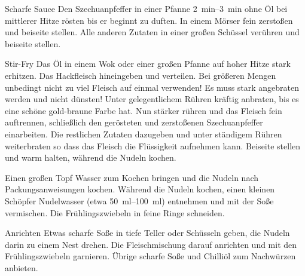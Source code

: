 \vspace{0.5cm}

\begin{recipestep}{Scharfe Sauce}
  Den Szechuanpfeffer in einer Pfanne \SIrange{2}{3}{\minute} ohne Öl bei mittlerer Hitze rösten bis er beginnt zu duften.
  In einem Mörser fein zerstoßen und beiseite stellen. Alle anderen Zutaten in einer großen Schüssel verühren und beiseite stellen.
\end{recipestep}

\begin{recipestep}{Stir-Fry}
  Das Öl in einem Wok oder einer großen Pfanne auf hoher Hitze stark erhitzen. Das Hackfleisch hineingeben und verteilen.
  Bei größeren Mengen unbedingt nicht zu viel Fleisch auf einmal verwenden! Es muss stark angebraten werden und nicht dünsten!
  Unter gelegentlichem Rühren kräftig anbraten, bis es eine schöne gold-braune Farbe hat. Nun stärker rühren und das Fleisch fein
  auftrennen, schließlich den gerösteten und zerstoßenen Szechuanpfeffer einarbeiten. Die restlichen Zutaten dazugeben und unter
  ständigem Rühren weiterbraten so dass das Fleisch die Flüssigkeit aufnehmen kann. Beiseite stellen und warm halten, während die Nudeln kochen.

  Einen großen Topf Wasser zum Kochen bringen und die Nudeln nach Packungsanweisungen kochen. Während die Nudeln kochen, einen kleinen Schöpfer
  Nudelwasser (etwa \SIrange{50}{100}{\milli\litre}) entnehmen und mit der Soße vermischen. Die Frühlingszwiebeln in feine Ringe schneiden.
\end{recipestep}

\begin{recipestep}{Anrichten}
  Etwas scharfe Soße in tiefe Teller oder Schüsseln geben, die Nudeln darin zu einem Nest drehen.
  Die Fleischmischung darauf anrichten und mit den Frühlingszwiebeln garnieren. Übrige scharfe Soße und Chilliöl
  zum Nachwürzen anbieten.
\end{recipestep}
